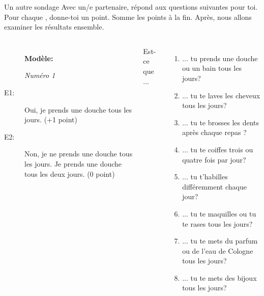 \documentclass{beamer}
\begin{document}
  \begin{frame}{Un autre sondage}
    \small
    Avec un/e partenaire, répond aux questions suivantes pour toi.
    Pour chaque , donne-toi un point.
    Somme les points à la fin.
    Après, nous allons examiner les résultats ensemble. \\
    \begin{columns}
      \scriptsize
        \begin{description}
          \item[] \textbf{Modèle:}
          \item[] \emph{Numéro 1}
          \item[E1:] Oui, je prends une douche tous les jours. (+1 point)
          \item[E2:] Non, je ne prends une douche tous les jours. Je prends une douche tous les deux jours. (0 point)
        \end{description}
        Est-ce que ...
        \begin{enumerate}
          \item ... tu prends une douche ou un bain tous les jours?
          \item ... tu te laves les cheveux tous les jours?
          \item ... tu te brosses les dents après chaque repas ?
          \item ... tu te coiffes trois ou quatre fois par jour?
          \item ... tu t'habilles différemment chaque jour?
          \item ... tu te maquilles ou tu te rases tous les jours?
          \item ... tu te mets du parfum ou de l'eau de Cologne tous les jours?
          \item ... tu te mets des bijoux  tous les jours?
        \end{enumerate}
    \end{columns}
  \end{frame}
\end{document}
